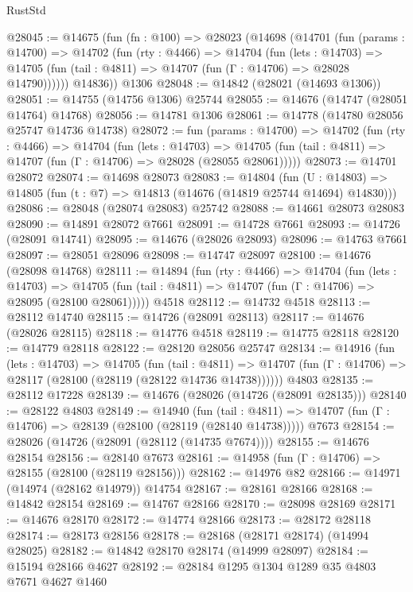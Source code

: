 \begin{lexlean}{RustStd}
\begin{coremodule}
@28045 := @14675
    (fun (fn : @100) =>
    @28023
      (@14698
        (@14701
          (fun (params : @14700) =>
          @14702
            (fun (rty : @4466) =>
            @14704
              (fun (lets : @14703) =>
              @14705 (fun (tail : @4811) => @14707 (fun (Γ : @14706) => @28028 @14790))))))
        @14836))
    @1306
@28048 := @14842 (@28021 (@14693 @1306))
@28051 := @14755 (@14756 @1306) @25744
@28055 := @14676 (@14747 (@28051 @14764) @14768)
@28056 := @14781 @1306
@28061 := @14778 (@14780 @28056 @25747 @14736 @14738)
@28072 := fun (params : @14700) =>
  @14702
    (fun (rty : @4466) =>
    @14704
      (fun (lets : @14703) =>
      @14705 (fun (tail : @4811) => @14707 (fun (Γ : @14706) => @28028 (@28055 @28061)))))
@28073 := @14701 @28072
@28074 := @14698 @28073
@28083 := @14804
    (fun (U : @14803) => @14805 (fun (t : @7) => @14813 (@14676 (@14819 @25744 @14694) @14830)))
@28086 := @28048 (@28074 @28083) @25742
@28088 := @14661 @28073 @28083
@28090 := @14891 @28072 @7661
@28091 := @14728 @7661
@28093 := @14726 (@28091 @14741)
@28095 := @14676 (@28026 @28093)
@28096 := @14763 @7661
@28097 := @28051 @28096
@28098 := @14747 @28097
@28100 := @14676 (@28098 @14768)
@28111 := @14894
    (fun (rty : @4466) =>
    @14704
      (fun (lets : @14703) =>
      @14705 (fun (tail : @4811) => @14707 (fun (Γ : @14706) => @28095 (@28100 @28061)))))
    @4518
@28112 := @14732 @4518
@28113 := @28112 @14740
@28115 := @14726 (@28091 @28113)
@28117 := @14676 (@28026 @28115)
@28118 := @14776 @4518
@28119 := @14775 @28118
@28120 := @14779 @28118
@28122 := @28120 @28056 @25747
@28134 := @14916
    (fun (lets : @14703) =>
    @14705
      (fun (tail : @4811) =>
      @14707 (fun (Γ : @14706) => @28117 (@28100 (@28119 (@28122 @14736 @14738))))))
    @4803
@28135 := @28112 @17228
@28139 := @14676 (@28026 (@14726 (@28091 @28135)))
@28140 := @28122 @4803
@28149 := @14940
    (fun (tail : @4811) => @14707 (fun (Γ : @14706) => @28139 (@28100 (@28119 (@28140 @14738)))))
    @7673
@28154 := @28026 (@14726 (@28091 (@28112 (@14735 @7674))))
@28155 := @14676 @28154
@28156 := @28140 @7673
@28161 := @14958 (fun (Γ : @14706) => @28155 (@28100 (@28119 @28156)))
@28162 := @14976 @82
@28166 := @14971 (@14974 (@28162 @14979)) @14754
@28167 := @28161 @28166
@28168 := @14842 @28154
@28169 := @14767 @28166
@28170 := @28098 @28169
@28171 := @14676 @28170
@28172 := @14774 @28166
@28173 := @28172 @28118
@28174 := @28173 @28156
@28178 := @28168 (@28171 @28174) (@14994 @28025)
@28182 := @14842 @28170 @28174 (@14999 @28097)
@28184 := @15194 @28166 @4627
@28192 := @28184 @1295 @1304 @1289 @35 @4803 @7671 @4627 @1460

\end{coremodule}
\end{lexlean}
